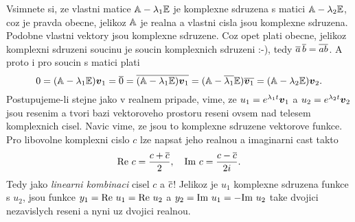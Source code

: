 Vsimnete si, ze vlastni matice ${\mathbb{A}}-\lambda_1 {\mathbb{E}}$ je komplexne sdruzena s matici
${\mathbb{A}}-\lambda_2 {\mathbb{E}}$, coz je pravda obecne, jelikoz ${\mathbb{A}}$ je realna a vlastni cisla jsou komplexne sdruzena.
Podobne vlastni vektory jsou komplexne sdruzene. Coz opet plati obecne, jelikoz komplexni sdruzeni
soucinu je soucin komplexnich sdruzeni :-), tedy $\overline{a}\,\overline{b}=\overline{ab}$. A proto i 
pro soucin s matici plati
\[
  0=({\mathbb{A}}-\lambda_1 {\mathbb{E}})\mathbf{\boldsymbol{v}}_1=\overline{0}=\overline{({\mathbb{A}}-\lambda_1 {\mathbb{E}})\mathbf{\boldsymbol{v}}_1}
  =({\mathbb{A}}-\overline{\lambda_1} {\mathbb{E}})\overline{\mathbf{\boldsymbol{v}}_1}=({\mathbb{A}}-\lambda_2 {\mathbb{E}})\mathbf{\boldsymbol{v}}_2.
\]
Postupujeme-li stejne jako v realnem pripade, vime, ze $u_1=e^{\lambda_1 t}\mathbf{\boldsymbol{v}}_1$ a $u_2=e^{\lambda_2 t}\mathbf{\boldsymbol{v}}_2$
jsou resenim a tvori bazi vektoroveho prostoru reseni ovsem nad telesem komplexnich cisel.
Navic vime, ze jsou to komplexne sdruzene vektorove funkce. Pro libovolne komplexni cislo $c$
lze napsat jeho realnou a imaginarni cast takto
\[
  {\rm Re}\ c=\frac{c+\close{c}}{2},\quad{\rm Im}\ c=\frac{c-\close{c}}{2i}.
\]
Tedy jako {\it linearni kombinaci} cisel $c$ a $\overline{c}$!
Jelikoz je $u_1$ komplexne sdruzena funkce s $u_2$, jsou funkce $y_1={\rm Re}\ u_1={\rm Re}\ u_2$ a 
$y_2={\rm Im}\ u_1=-{\rm Im}\ u_2$ take dvojici nezavislych reseni a nyni uz dvojici realnou.

